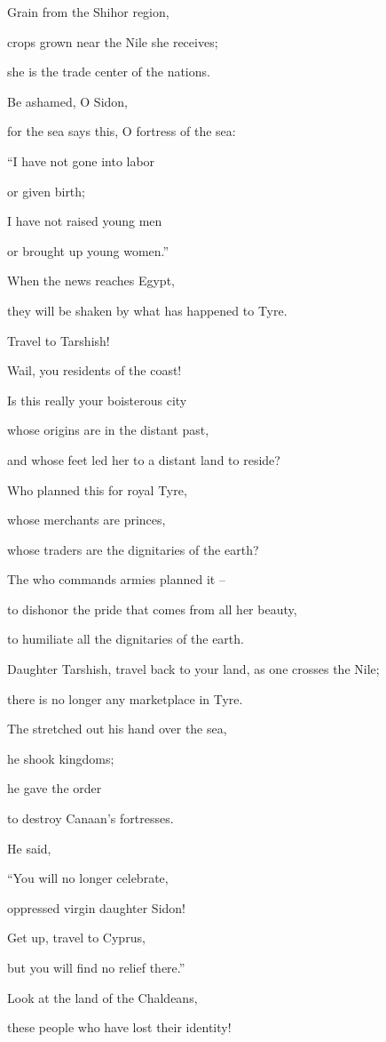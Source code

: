 {\par }{\Q Grain
from the Shihor
region,

\par }{\Q crops
grown near the Nile
she receives;
\par }{\Q she is
the trade center
of the nations.
\par }{\Q {}Be ashamed,
O Sidon,
\par }{\Q for
the sea
says
this, O fortress
of the sea:
\par }{\Q “I have not
gone into labor
\par }{\Q or
given birth;
\par }{\Q I have not
raised
young men
\par }{\Q or brought up
young women.”
\par }{\Q {}When the news
reaches Egypt,
\par }{\Q they will be shaken
by what has happened
to Tyre.
\par }{\Q {}Travel
to Tarshish!
\par }{\Q Wail,
you residents
of the coast!
\par }{\Q {}Is this
really your boisterous
city

\par }{\Q whose origins
are in the distant past,
\par }{\Q and whose feet
led
her to a distant land
to reside?
\par }{\Q {}Who
planned
this
for royal
Tyre,
\par }{\Q whose merchants
are princes,
\par }{\Q whose
traders
are the dignitaries
of the earth?
\par }{\Q {}The
{}
who commands armies
planned
it
–
\par }{\Q to dishonor
the pride
that comes from all
her beauty,
\par }{\Q to humiliate
all
the dignitaries
of the earth.
\par }{\Q {}Daughter
Tarshish,
travel
back to your land,
as one crosses the Nile;
\par }{\Q there is no
longer
any marketplace in Tyre.
\par }{\Q {}The
{}
stretched out
his hand
over
the sea,
\par }{\Q he shook
kingdoms;
\par }{\Q he gave the order
\par }{\Q to
destroy
Canaan’s
fortresses.
\par }{\Q {}He said,
\par }{\Q “You will no
longer
celebrate,
\par }{\Q oppressed
virgin
daughter
Sidon!
\par }{\Q Get
up, travel
to Cyprus,
\par }{\Q but you will find no
relief
there.”
\par }{\Q {}Look
at the land
of the Chaldeans,
\par }{\Q these
people
who have lost their identity!

}
